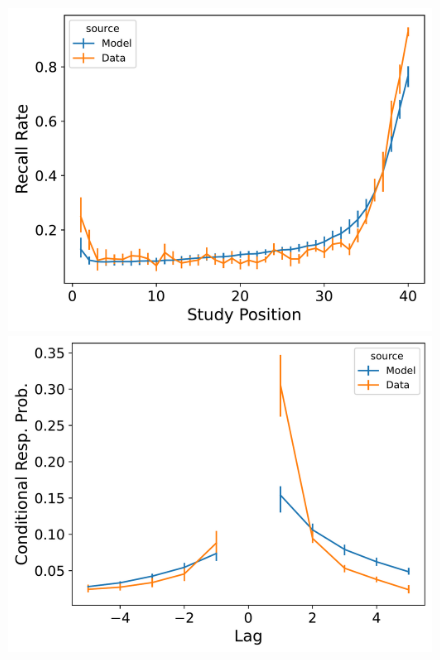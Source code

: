 \documentclass[
  letterpaper,
  11pt,
  english,
  singlespacing,
  headsepline]{MastersDoctoralThesis}
\begin{document}
\begin{figure}
\begin{minipage}{0.33\linewidth}
\includegraphics{icmr_figures/Murdock1962_ConnectionistCMR_Model_Fitting_LL40_spc-1.png}\end{minipage}%
\newline
\begin{minipage}{0.33\linewidth}
\includegraphics{icmr_figures/Murdock1962_InstanceCMR_Model_Fitting_LL40_crp-1.png}\end{minipage}%
%
\begin{minipage}{0.33\linewidth}

\end{minipage}
\end{figure}
\end{document}
